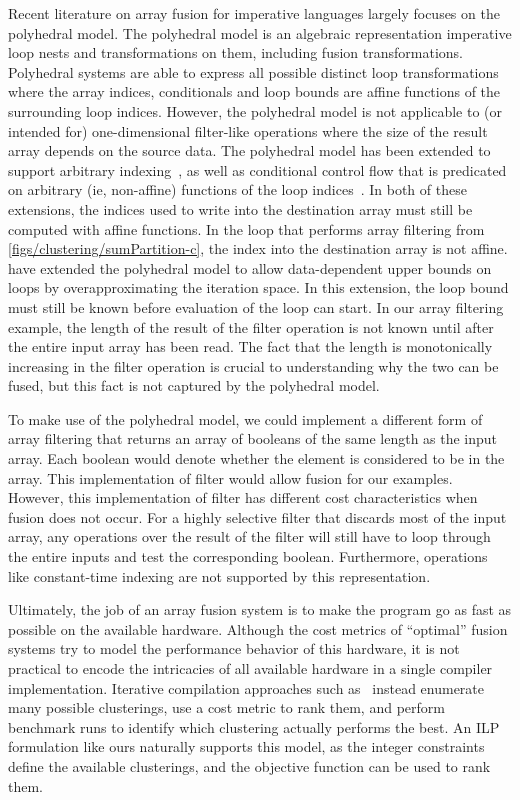 Recent literature on array fusion for imperative languages largely focuses on the polyhedral model.
The polyhedral model is an algebraic representation imperative loop nests and transformations on them, including fusion transformations.
Polyhedral systems \cite{pouchet2011polyhedral} are able to express all possible distinct loop transformations where the array indices, conditionals and loop bounds are affine functions of the surrounding loop indices.
However, the polyhedral model is not applicable to (or intended for) one-dimensional filter-like operations where the size of the result array depends on the source data.
The polyhedral model has been extended to support arbitrary indexing~\cite{venkat2014polyhedral}, as well as conditional control flow that is predicated on arbitrary (ie, non-affine) functions of the loop indices~\cite{benabderrahmane2010polyhedral}.
In both of these extensions, the indices used to write into the destination array must still be computed with affine functions. 
In the loop that performs array filtering from \cref{figs/clustering/sumPartition-c}, the index into the destination array is not affine.
\citet{zhao2018polyhedral} have extended the polyhedral model to allow data-dependent upper bounds on loops by overapproximating the iteration space.
In this extension, the loop bound must still be known before evaluation of the loop can start.
In our array filtering example, the length of the result of the filter operation is not known until after the entire input array has been read.
The fact that the length is monotonically increasing in the filter operation is crucial to understanding why the two can be fused, but this fact is not captured by the polyhedral model.

To make use of the polyhedral model, we could implement a different form of array filtering that returns an array of booleans of the same length as the input array.
Each boolean would denote whether the element is considered to be in the array.
This implementation of filter would allow fusion for our examples.
However, this implementation of filter has different cost characteristics when fusion does not occur.
For a highly selective filter that discards most of the input array, any operations over the result of the filter will still have to loop through the entire inputs and test the corresponding boolean.
Furthermore, operations like constant-time indexing are not supported by this representation.


Ultimately, the job of an array fusion system is to make the program go as fast as possible on the available hardware.
Although the cost metrics of ``optimal'' fusion systems try to model the performance behavior of this hardware, it is not practical to encode the intricacies of all available hardware in a single compiler implementation.
Iterative compilation approaches such as~\citet{ashby2006iterative} instead enumerate many possible clusterings, use a cost metric to rank them, and perform benchmark runs to identify which clustering actually performs the best.
An ILP formulation like ours naturally supports this model, as the integer constraints define the available clusterings, and the objective function can be used to rank them.



